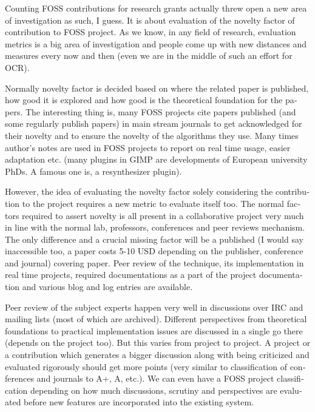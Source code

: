 \vskip 2pt
\begin{english}
Counting FOSS contributions for research grants actually threw open
a new area of investigation as such, I guess. It is about evaluation of the novelty
factor of contribution to FOSS project. As we know, in any field of research,
evaluation metrics is a big area of investigation and people come up with new
distances and measures every now and then (even we are in the middle of
such an effort for OCR). 

Normally novelty factor is decided based on where
the related paper is published, how good it is explored and how good is the
theoretical foundation for the papers. The interesting thing is, many FOSS
projects cite papers published (and some regularly publish papers) in main
stream journals to get acknowledged for their novelty and to ensure the novelty of
the algorithms they use. Many times author's notes are used in FOSS projects to
report on real time usage, easier adaptation etc. (many plugins in GIMP are
developments of European university PhDs. A famous one is, a resynthesizer plugin).

However, the idea of evaluating the novelty factor solely considering the contribution
to the project requires a new metric to evaluate itself too. The normal factors
required to assert novelty is all present in a collaborative project very
much in line with the normal lab, professors, conferences and peer reviews mechanism.
The only difference and a crucial missing factor will be a published (I would
say inaccessible too, a paper costs 5-10 USD depending on the publisher,
conference and journal) covering paper. Peer review of the technique,
its implementation in real time projects, required documentations as a
part of the project documentation and various blog and log entries are
available.

Peer review of the subject experts happen very well in discussions
over IRC and mailing lists (most of which are archived). Different perspectives
from theoretical foundations to practical implementation issues are discussed
in a single go there (depends on the project too). But this varies from project
to project. A project or a contribution which generates a bigger discussion
along with being criticized and evaluated rigorously should get more points (very similar
to classification of conferences and journals to A+, A, etc.).  We can even
have a FOSS project classification depending on how much discussions, scrutiny
and perspectives are evaluated before new features are incorporated into the
existing system.


\end{english}
